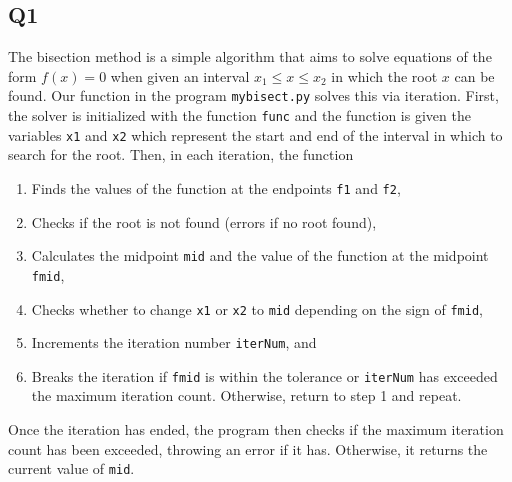 \documentclass[12pt, letterpaper, titlepage]{article}
\begin{document}
\subsection*{Q1}
The bisection method is a simple algorithm that aims to solve equations of the form $f(x) = 0$ when given an interval $x_1 \leq x \leq x_2$ in which the root $x$ can be found. Our function in the program \lstinline{mybisect.py} solves this via iteration. First, the solver is initialized with the function \lstinline{func} and the function is given the variables \lstinline{x1} and \lstinline{x2} which represent the start and end of the interval in which to search for the root. Then, in each iteration, the function 
\begin{enumerate}
    \item Finds the values of the function at the endpoints \lstinline{f1} and \lstinline{f2},
    \item Checks if the root is not found (errors if no root found),
    \item Calculates the midpoint \lstinline{mid} and the value of the function at the midpoint \lstinline{fmid},
    \item Checks whether to change \lstinline{x1} or \lstinline{x2} to \lstinline{mid} depending on the sign of \lstinline{fmid},
    \item Increments the iteration number \lstinline{iterNum}, and
    \item Breaks the iteration if \lstinline{fmid} is within the tolerance or \lstinline{iterNum} has exceeded the maximum iteration count. Otherwise, return to step 1 and repeat.
\end{enumerate}
Once the iteration has ended, the program then checks if the maximum iteration count has been exceeded, throwing an error if it has. Otherwise, it returns the current value of \lstinline{mid}.

\newpage
\end{document}
